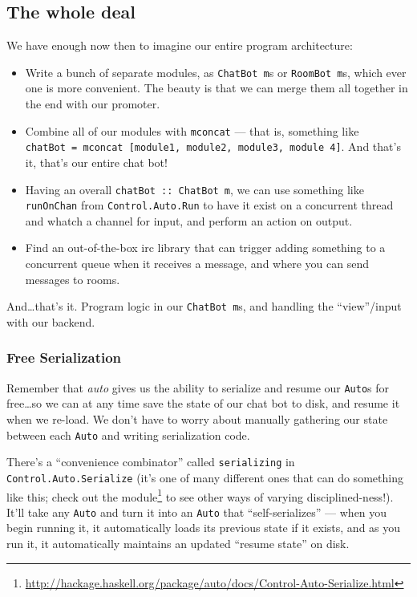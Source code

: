 \documentclass[]{article}
\renewcommand{\href}[2]{#2\footnote{\url{#1}}}
\begin{document}
\subsection{The whole deal}\label{the-whole-deal}

We have enough now then to imagine our entire program architecture:

\begin{itemize}
\tightlist
\item
  Write a bunch of separate modules, as \texttt{ChatBot\ m}s or
  \texttt{RoomBot\ m}s, which ever one is more convenient. The beauty is
  that we can merge them all together in the end with our promoter.
\item
  Combine all of our modules with \texttt{mconcat} --- that is,
  something like
  \texttt{chatBot\ =\ mconcat\ {[}module1,\ module2,\ module3,\ module\ 4{]}}.
  And that's it, that's our entire chat bot!
\item
  Having an overall \texttt{chatBot\ ::\ ChatBot\ m}, we can use
  something like \texttt{runOnChan} from \texttt{Control.Auto.Run} to
  have it exist on a concurrent thread and whatch a channel for input,
  and perform an action on output.
\item
  Find an out-of-the-box irc library that can trigger adding something
  to a concurrent queue when it receives a message, and where you can
  send messages to rooms.
\end{itemize}

And\ldots{}that's it. Program logic in our \texttt{ChatBot\ m}s, and
handling the ``view''/input with our backend.

\subsubsection{Free Serialization}\label{free-serialization}

Remember that \emph{auto} gives us the ability to serialize and resume
our \texttt{Auto}s for free\ldots{}so we can at any time save the state
of our chat bot to disk, and resume it when we re-load. We don't have to
worry about manually gathering our state between each \texttt{Auto} and
writing serialization code.

There's a ``convenience combinator'' called
\texttt{serializing\textquotesingle{}} in
\texttt{Control.Auto.Serialize} (it's one of many different ones that
can do something like this;
\href{http://hackage.haskell.org/package/auto/docs/Control-Auto-Serialize.html}{check
out the module} to see other ways of varying disciplined-ness!). It'll
take any \texttt{Auto} and turn it into an \texttt{Auto} that
``self-serializes'' --- when you begin running it, it automatically
loads its previous state if it exists, and as you run it, it
automatically maintains an updated ``resume state'' on disk.
\end{document}

